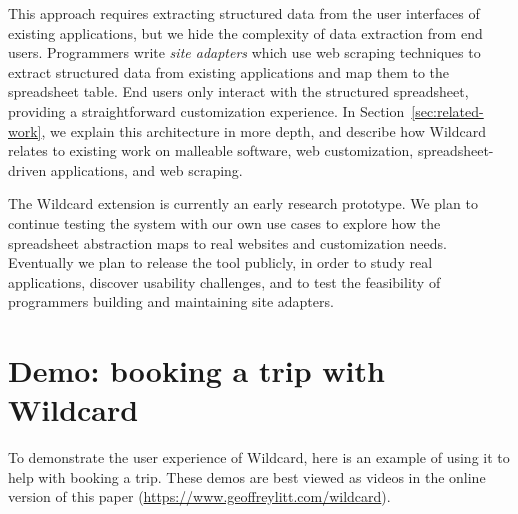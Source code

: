 \documentclass[english,submission]{programming}
\begin{document}
This approach requires extracting structured data from the user
interfaces of existing applications, but we hide the complexity of data
extraction from end users. Programmers write \emph{site adapters} which
use web scraping techniques to extract structured data from existing
applications and map them to the spreadsheet table. End users only
interact with the structured spreadsheet, providing a straightforward
customization experience. In Section~\ref{sec:related-work}, we explain
this architecture in more depth, and describe how Wildcard relates to
existing work on malleable software, web customization,
spreadsheet-driven applications, and web scraping.

The Wildcard extension is currently an early research prototype. We plan
to continue testing the system with our own use cases to explore how the
spreadsheet abstraction maps to real websites and customization needs.
Eventually we plan to release the tool publicly, in order to study real
applications, discover usability challenges, and to test the feasibility
of programmers building and maintaining site adapters.

\hypertarget{sec:demos}{%
\section{Demo: booking a trip with Wildcard}\label{sec:demos}}

To demonstrate the user experience of Wildcard, here is an example of
using it to help with booking a trip.{ These demos are best viewed as
videos in the online version of this paper
(\url{https://www.geoffreylitt.com/wildcard}).}
\end{document}
